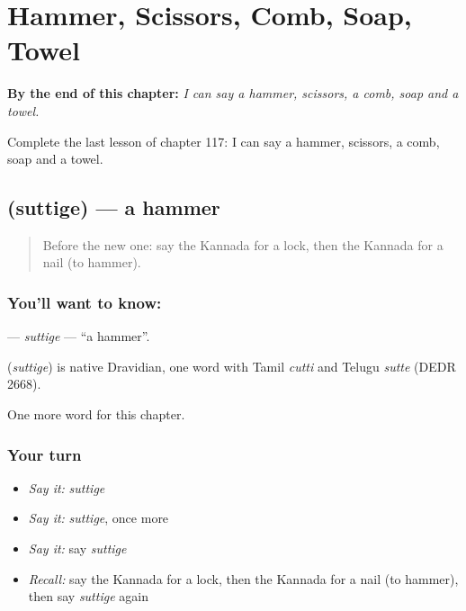 
\chapter{Hammer, Scissors, Comb, Soap, Towel}
\label{ch:ka-hammer-scissors-comb-soap-towel}

\begin{chapteropening}
\textbf{By the end of this chapter:} \emph{I can say a hammer, scissors, a comb, soap and a towel.}

Complete the last lesson of chapter 117: I can say a hammer, scissors, a comb, soap and a towel.
\end{chapteropening}

\section[\texorpdfstring{\kn{ಸುತ್ತಿಗೆ} (suttige)}{ಸುತ್ತಿಗೆ (suttige)}]{ (suttige) — a hammer}

\label{lesson:KA-C117-suttige}



\begin{quote}
Before the new one: say the Kannada for a lock, then the Kannada for a nail (to hammer).
\end{quote}

\subsection*{You'll want to know: }
\textbf{} — \emph{suttige} — \textquotedblleft{}a hammer\textquotedblright{}.

\begin{cousinweb}
\textbf{} (\emph{suttige}) is native Dravidian, one word with Tamil \emph{cutti} and Telugu \emph{sutte} (DEDR 2668).
\end{cousinweb}

\begin{grammarlens}[title={What you've built}]
One more word for this chapter.
\end{grammarlens}

\subsection*{Your turn}
\begin{itemize}
\raggedright
  \item \emph{Say it:} \emph{suttige}
  \item \emph{Say it:} \emph{suttige}, once more
  \item \emph{Say it:} say \emph{suttige}
  \item \emph{Recall:} say the Kannada for a lock, then the Kannada for a nail (to hammer), then say \emph{suttige} again
\end{itemize}

